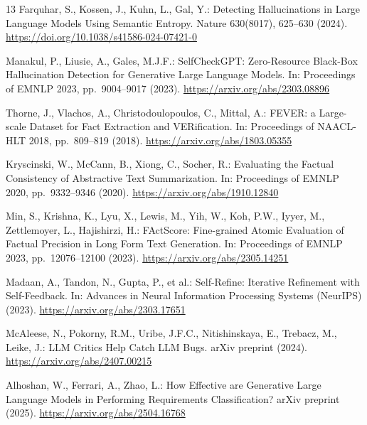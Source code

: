 \documentclass[runningheads]{llncs}
\begin{document}
\begin{thebibliography}{13}
Farquhar, S., Kossen, J., Kuhn, L., Gal, Y.:
Detecting Hallucinations in Large Language Models Using Semantic Entropy.
Nature 630(8017), 625--630 (2024).
\url{https://doi.org/10.1038/s41586-024-07421-0}

Manakul, P., Liusie, A., Gales, M.J.F.:
SelfCheckGPT: Zero-Resource Black-Box Hallucination Detection for Generative Large Language Models.
In: Proceedings of EMNLP 2023, pp.\ 9004--9017 (2023).
\url{https://arxiv.org/abs/2303.08896}

Thorne, J., Vlachos, A., Christodoulopoulos, C., Mittal, A.:
FEVER: a Large-scale Dataset for Fact Extraction and VERification.
In: Proceedings of NAACL-HLT 2018, pp.\ 809--819 (2018).
\url{https://arxiv.org/abs/1803.05355}

Kryscinski, W., McCann, B., Xiong, C., Socher, R.:
Evaluating the Factual Consistency of Abstractive Text Summarization.
In: Proceedings of EMNLP 2020, pp.\ 9332--9346 (2020).
\url{https://arxiv.org/abs/1910.12840}

Min, S., Krishna, K., Lyu, X., Lewis, M., Yih, W., Koh, P.W., Iyyer, M., Zettlemoyer, L., Hajishirzi, H.:
FActScore: Fine-grained Atomic Evaluation of Factual Precision in Long Form Text Generation.
In: Proceedings of EMNLP 2023, pp.\ 12076--12100 (2023).
\url{https://arxiv.org/abs/2305.14251}

Madaan, A., Tandon, N., Gupta, P., et al.:
Self-Refine: Iterative Refinement with Self-Feedback.
In: Advances in Neural Information Processing Systems (NeurIPS) (2023).
\url{https://arxiv.org/abs/2303.17651}

McAleese, N., Pokorny, R.M., Uribe, J.F.C., Nitishinskaya, E., Trebacz, M., Leike, J.:
LLM Critics Help Catch LLM Bugs.
arXiv preprint (2024). \url{https://arxiv.org/abs/2407.00215}

Alhoshan, W., Ferrari, A., Zhao, L.:
How Effective are Generative Large Language Models in Performing Requirements Classification?
arXiv preprint (2025). \url{https://arxiv.org/abs/2504.16768}

\end{thebibliography}
\end{document}

